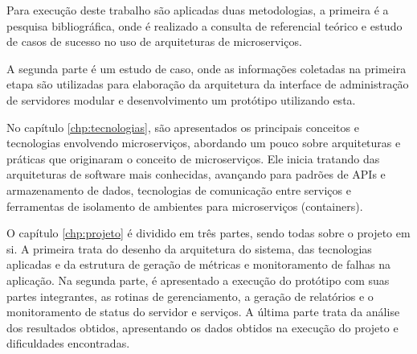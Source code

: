 Para execução deste trabalho são aplicadas duas metodologias, a primeira
é a pesquisa bibliográfica, onde é realizado a consulta de referencial
teórico e estudo de casos de sucesso no uso de arquiteturas de microserviços.

A segunda parte é um estudo de caso, onde as informações coletadas
na primeira etapa são utilizadas para elaboração da arquitetura da interface
de administração de servidores modular e desenvolvimento um protótipo
utilizando esta.

No capítulo \ref{chp:tecnologias}, são apresentados os principais conceitos
e tecnologias envolvendo microserviços, abordando um pouco sobre arquiteturas
e práticas que originaram o conceito de microserviços. Ele inicia tratando
das arquiteturas de software mais conhecidas, avançando para padrões de
\acp{API} e armazenamento de dados, tecnologias de comunicação entre serviços
e ferramentas de isolamento de ambientes para microserviços (containers).

O capítulo \ref{chp:projeto} é dividido em três partes, sendo todas sobre
o projeto em si. A primeira trata do desenho da arquitetura do sistema, das
tecnologias aplicadas e da estrutura de geração de métricas e monitoramento de
falhas na aplicação. Na segunda parte, é apresentado a execução do protótipo
com suas partes integrantes, as rotinas de gerenciamento, a geração de
relatórios e o monitoramento de status do servidor e serviços. A última parte
trata da análise dos resultados obtidos, apresentando os dados obtidos na
execução do projeto e dificuldades encontradas.
